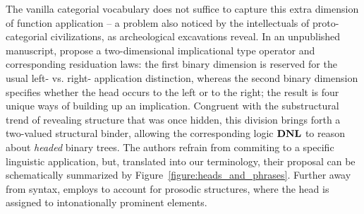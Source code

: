 The vanilla categorial vocabulary does not suffice to capture this extra dimension of function application -- a problem also noticed by the intellectuals of proto-categorial civilizations, as archeological excavations reveal.
In an unpublished manuscript, \citet{moortgat1991heads} propose a two-dimensional implicational type operator and corresponding residuation laws: the first binary dimension is reserved for the usual left- vs. right- application distinction, whereas the second binary dimension specifies whether the head occurs to the left or to the right; the result is four unique ways of building up an implication.
Congruent with the substructural trend of revealing structure that was once hidden, this division brings forth a two-valued structural binder, allowing the corresponding logic $\textbf{DNL}$ to reason about \textit{headed} binary trees.
The authors refrain from commiting to a specific linguistic application, but, translated into our terminology, their proposal can be schematically summarized by Figure~\ref{figure:heads_and_phrases}.
Further away from syntax, \citet{hendriks1997logic} employs  to account for prosodic structures, where the head is assigned to intonationally prominent elements.

